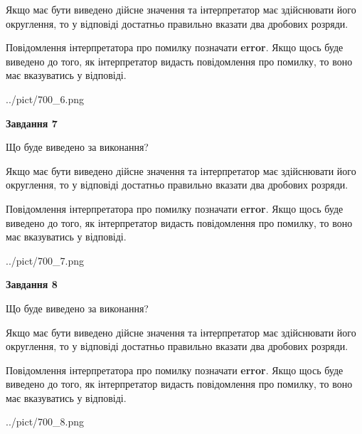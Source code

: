 \documentclass[12pt, ukrainian]{article}
\begin{document}
{\begin {Large}
Якщо має бути виведено дійсне значення та інтерпретатор має здійснювати його округлення, 
то у відповіді достатньо правильно вказати два дробових розряди.

Повідомлення інтерпретатора про помилку позначати \textbf{error}.
Якщо щось буде виведено до того, як інтерпретатор видасть повідомлення про помилку, 
то воно має вказуватись у відповіді. \par

\begin{center}
	{../pict/700_6.png}
\end{center}
\newpage

{\begin {center}\textbf{Завдання 7}\end {center}}\par
Що буде виведено за виконання? \par

Якщо має бути виведено дійсне значення та інтерпретатор має здійснювати його округлення, 
то у відповіді достатньо правильно вказати два дробових розряди.

Повідомлення інтерпретатора про помилку позначати \textbf{error}.
Якщо щось буде виведено до того, як інтерпретатор видасть повідомлення про помилку, 
то воно має вказуватись у відповіді. \par

\begin{center}
	{../pict/700_7.png}
\end{center}
\newpage

{\begin {center}\textbf{Завдання 8}\end {center}}\par
Що буде виведено за виконання? \par

Якщо має бути виведено дійсне значення та інтерпретатор має здійснювати його округлення, 
то у відповіді достатньо правильно вказати два дробових розряди.

Повідомлення інтерпретатора про помилку позначати \textbf{error}.
Якщо щось буде виведено до того, як інтерпретатор видасть повідомлення про помилку, 
то воно має вказуватись у відповіді. \par

\begin{center}
	{../pict/700_8.png}
\end{center}
\newpage


\end{Large}}
\end{document}
